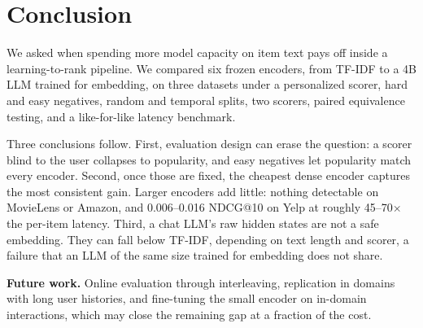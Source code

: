 \section{Conclusion}
\label{sec:conclusion}

We asked when spending more model capacity on item text pays off inside
a learning-to-rank pipeline. We compared six frozen encoders, from
TF-IDF to a 4B LLM trained for embedding, on three datasets under a
personalized scorer, hard and easy negatives, random and temporal
splits, two scorers, paired equivalence testing, and a like-for-like
latency benchmark.

Three conclusions follow. First, evaluation design can erase the
question: a scorer blind to the user collapses to popularity, and easy
negatives let popularity match every encoder. Second, once those are
fixed, the cheapest dense encoder captures the most consistent gain.
Larger encoders add little: nothing detectable on MovieLens or Amazon,
and 0.006--0.016 NDCG@10 on Yelp at roughly 45--70$\times$ the per-item
latency. Third, a chat LLM's raw hidden states are not a safe embedding.
They can fall below TF-IDF, depending on text length and scorer, a
failure that an LLM of the same size trained for embedding does not
share.

\textbf{Future work.} Online evaluation through interleaving,
replication in domains with long user histories, and fine-tuning the
small encoder on in-domain interactions, which may close the remaining
gap at a fraction of the cost.
